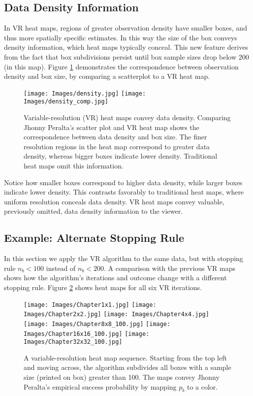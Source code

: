 \subsection{Data Density Information}

In VR heat maps, regions of greater observation density have smaller boxes, and thus more spatially specific estimates. In this way the size of the box conveys density information, which heat maps typically conceal. This new feature derives from the fact that box subdivisions persist until box sample sizes drop below 200 (in this map). Figure \ref{fig:density} demonstrates the correspondence between observation density and box size, by comparing a scatterplot to a VR heat map. 
        \begin{figure}[H]
      	\centering
      	\texttt{[image: Images/density.jpg]}
      	\texttt{[image: Images/density\_comp.jpg]} 
      	\caption{Variable-resolution (VR) heat maps convey data density. Comparing Jhonny Peralta's scatter plot and VR heat map shows the correspondence between data density and box size. The finer resolution regions in the heat map correspond to greater data density, whereas bigger boxes indicate lower density. Traditional heat maps omit this information.}
      	\label{fig:density}
      	\end{figure}
Notice how smaller boxes correspond to higher data density, while larger boxes indicate lower density. This contrasts favorably to traditional heat maps, where uniform resolution conceals data density. VR heat maps convey valuable, previously omitted, data density information to the viewer. 
      	
\subsection{Example: Alternate Stopping Rule} %
      	
In this section we apply the VR algorithm to the same data, but with stopping rule $n_{b} < 100$ instead of $n_{b} < 200$. A comparison with the previous VR maps shows how the algorithm's iterations and outcome change with a different stopping rule. Figure \ref{fig:altsr} shows heat maps for all six VR iterations.
        \begin{figure}[H]
      	\centering
      	\texttt{[image: Images/Chapter1x1.jpg]}
      	\texttt{[image: Images/Chapter2x2.jpg]}
      	\texttt{[image: Images/Chapter4x4.jpg]}
      	\texttt{[image: Images/Chapter8x8\_100.jpg]}
      	\texttt{[image: Images/Chapter16x16\_100.jpg]}
      	\texttt{[image: Images/Chapter32x32\_100.jpg]}
      	\caption{A variable-resolution heat map sequence. Starting from the top left and moving across, the algorithm subdivides all boxes with a sample size (printed on box) greater than 100. The maps convey Jhonny Peralta's empirical success probability by mapping $p_{b}$ to a color.}
      	\label{fig:altsr}
\end{figure} 	

